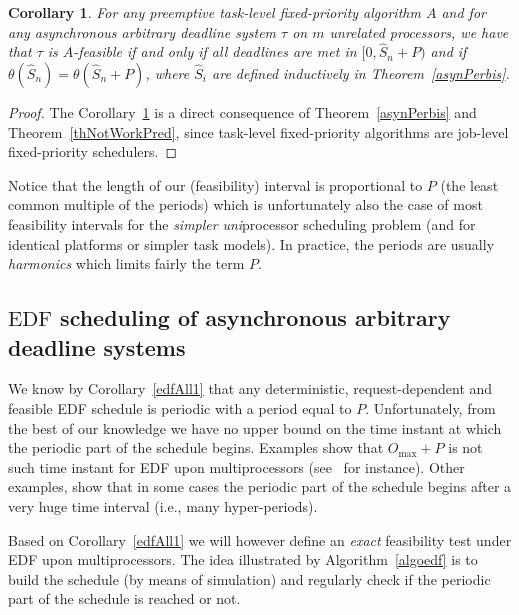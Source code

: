 \documentclass[a4paper,11pt]{article}
\newcommand{\EDF}{\textrm{EDF}}
\newtheorem{Corollary}[Theorem]{Corollary}
\begin{document}
\begin{Corollary}\label{helpbis} For any preemptive task-level fixed-priority algorithm $A$ and for any asynchronous arbitrary deadline system $\tau$ on $m$ unrelated
processors, we have that $\tau$ is $A$-feasible if and only if all deadlines are met in $[0, \widehat{S}_n+P)$ and if $\theta(\widehat{S}_{n})=\theta(\widehat{S}_{n}+P)$, where $\widehat{S}_i$ are defined inductively in Theorem~\ref{asynPerbis}.
\end{Corollary}

\begin{proof}
  The Corollary~\ref{helpbis} is a direct consequence of
  Theorem~\ref{asynPerbis} and Theorem~\ref{thNotWorkPred}, since task-level   fixed-priority algorithms are job-level fixed-priority schedulers.
\end{proof}


Notice that the length of our (feasibility) interval is
proportional to $P$ (the least common multiple of the
periods) which is unfortunately also the case of most
feasibility intervals for the \emph{simpler}
\emph{uni}processor scheduling problem (and for identical platforms or
simpler task models). In practice, the periods are usually
\emph{harmonics} which limits fairly the term $P$.

\subsection{{$\EDF$} scheduling of asynchronous arbitrary
  deadline systems}\label{edf}

We know by Corollary~\ref{edfAll1} that any deterministic, request-dependent and feasible
\EDF{} schedule is periodic with a period equal to $P$. Unfortunately,
from the best of our knowledge we have no upper bound on the time
instant at which the periodic part of the schedule begins. Examples
show that $O_{\max}+P$ is not such time instant for \EDF{} upon
multiprocessors (see~\cite{Braun2007Negative-Result} for instance).
Other examples, show that in some cases the periodic part of the
schedule begins after a very huge time interval (i.e., many
hyper-periods).

Based on Corollary~\ref{edfAll1} we will however define an \emph{exact} feasibility test under \EDF{} upon multiprocessors. The idea illustrated by Algorithm~\ref{algoedf} is to build the schedule (by means of simulation) and regularly check if the periodic part of the schedule is reached or not.
\end{document}
